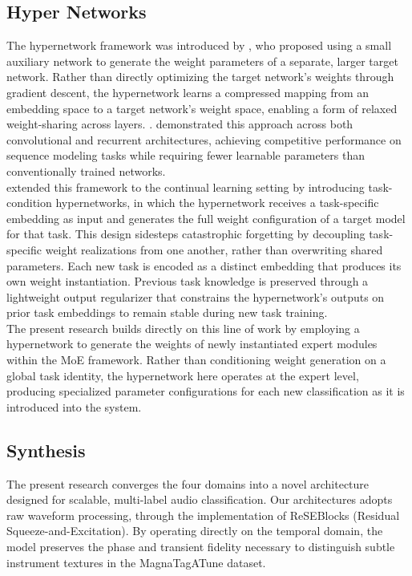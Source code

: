 \documentclass{article}
\begin{document}
\subsection{Hyper Networks}
The hypernetwork framework was introduced by \textcite{Hypernetworks}, who proposed using a small auxiliary network to generate the weight parameters of a separate, larger target network. Rather than directly optimizing the target network’s weights through gradient descent, the hypernetwork learns a compressed mapping from an embedding space to a target network’s weight space, enabling a form of relaxed weight-sharing across layers. \textcite{Hypernetworks}. demonstrated this approach across both convolutional and recurrent architectures, achieving competitive performance on sequence modeling tasks while requiring fewer learnable parameters than conventionally trained networks.\\

\noindent \textcite{ContinualLearningHyper} extended this framework to the continual learning setting by introducing task-condition hypernetworks, in which the hypernetwork receives a task-specific embedding as input and generates the full weight configuration of a target model for that task. This design sidesteps catastrophic forgetting by decoupling task-specific weight realizations from one another, rather than overwriting shared parameters. Each new task is encoded as a distinct embedding that produces its own weight instantiation. Previous task knowledge is preserved through a lightweight output regularizer that constrains the hypernetwork’s outputs on prior task embeddings to remain stable during new task training. \\

\noindent The present research builds directly on this line of work by employing a hypernetwork to generate the weights of newly instantiated expert modules within the MoE framework. Rather than conditioning weight generation on a global task identity, the hypernetwork here operates at the expert level, producing specialized parameter configurations for each new classification as it is introduced into the system.\\

\subsection{Synthesis}
The present research converges the four domains into a novel architecture designed for scalable, multi-label audio classification. Our architectures adopts raw waveform processing, through the implementation of ReSEBlocks (Residual Squeeze-and-Excitation). By operating directly on the temporal domain, the model preserves the phase and transient fidelity necessary to distinguish subtle instrument textures in the MagnaTagATune dataset. \\
\end{document}
